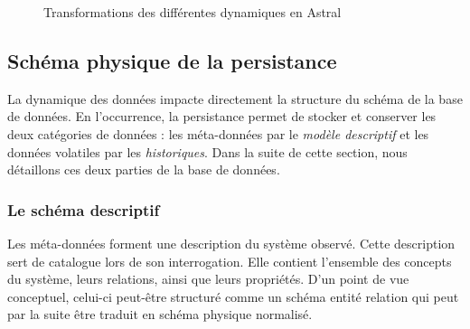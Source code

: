 \begin{figure}[ht]
    \centering
{}
\caption{Transformations des différentes dynamiques en Astral}\label{fig:contrib:asteroid:theorie:dynamics}
\end{figure}

\subsection{Schéma physique de la persistance}\label{sec:contrib:asteroid:theorie:schema}
La dynamique des données impacte directement la structure du schéma de la base de données. En l'occurrence, la persistance permet de stocker et conserver les deux catégories de données : les méta-données par le \textit{modèle descriptif} et les données volatiles par les \textit{historiques}. Dans la suite de cette section, nous détaillons ces deux parties de la base de données.

\subsubsection{Le schéma descriptif}
Les méta-données forment une description du système observé. Cette description sert de catalogue lors de son interrogation. Elle contient l'ensemble des concepts du système, leurs relations, ainsi que leurs propriétés. D'un point de vue conceptuel, celui-ci peut-être structuré comme un schéma entité relation qui peut par la suite être traduit en schéma physique normalisé.

